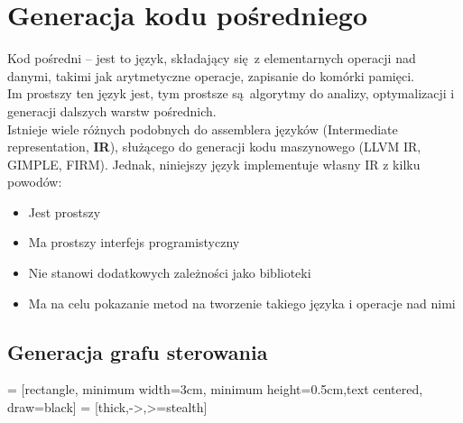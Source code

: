 \documentclass[leqno, 12pt]{article}
\begin{document}
	\section{Generacja kodu pośredniego}
		
		Kod pośredni -- jest to język, składający się z elementarnych operacji nad danymi, takimi jak
		arytmetyczne operacje, zapisanie do komórki pamięci.
		\\
		
		Im prostszy ten język jest, tym prostsze
		są algorytmy do analizy, optymalizacji i generacji dalszych warstw pośrednich.
		\\
		
		Istnieje wiele różnych podobnych do assemblera języków (Intermediate representation, \textbf{IR}), służącego
		do generacji kodu maszynowego (LLVM IR, GIMPLE, FIRM). Jednak, niniejszy język implementuje własny IR z
		kilku powodów:
		
		\begin{itemize}
			\item Jest prostszy
			\item Ma prostszy interfejs programistyczny
			\item Nie stanowi dodatkowych zależności jako biblioteki
			\item Ma na celu pokazanie metod na tworzenie takiego języka i operacje nad nimi
		\end{itemize}
		
		\subsection{Generacja grafu sterowania}

		 = [rectangle, minimum width=3cm, minimum height=0.5cm,text centered, draw=black]
		 = [thick,->,>=stealth]
\end{document}
